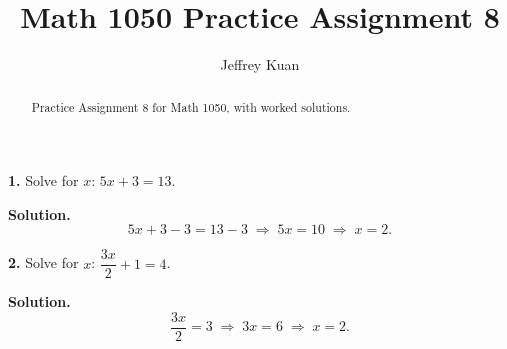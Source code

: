 \documentclass{ximera}
\author{Jeffrey Kuan}
\title{Math 1050 Practice Assignment 8}
\begin{document}
\begin{abstract}
    Practice Assignment 8 for Math 1050, with worked solutions.
\end{abstract}

\maketitle

\begin{problem}

\textbf{1.} Solve for $x$: $5x+3=13$.

\begin{hint}
\textbf{Solution.}
\[
  5x+3-3=13-3 \;\Longrightarrow\; 5x=10 \;\Longrightarrow\; x=2 .
\]
\end{hint}
\end{problem}

\begin{problem}

\textbf{2.} Solve for $x$: $\dfrac{3x}{2}+1=4$.

\begin{hint}
\textbf{Solution.}
\[
  \frac{3x}{2}=3 \;\Longrightarrow\; 3x=6 \;\Longrightarrow\; x=2 .
\]
\end{hint}
\end{problem}
\end{document}
